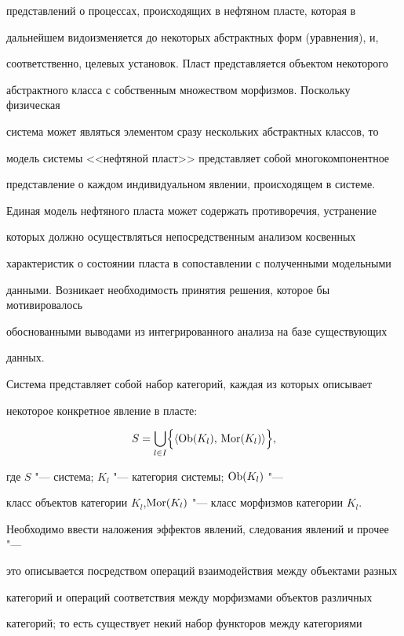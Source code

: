 представлений о процессах, происходящих в нефтяном пласте, которая в

дальнейшем видоизменяется до некоторых абстрактных форм (уравнения), и,

соответственно, целевых установок. Пласт представляется объектом некоторого

абстрактного класса с собственным множеством морфизмов. Поскольку физическая

система может являться элементом сразу нескольких абстрактных классов, то

модель системы <<нефтяной пласт>> представляет собой многокомпонентное

представление о каждом индивидуальном явлении, происходящем в системе.

Единая модель нефтяного пласта может содержать противоречия, устранение

которых должно осуществляться непосредственным анализом косвенных

характеристик о состоянии пласта в сопоставлении с полученными модельными

данными. Возникает необходимость принятия решения, которое бы мотивировалось

обоснованными выводами из интегрированного анализа на базе существующих

данных.



Система представляет собой набор категорий, каждая из которых описывает

некоторое конкретное явление в пласте:

$$

S=\bigcup\limits_{l \in I}

\Bigl\{ \left\langle {\rm Ob}(K_l ),\, {\rm Mor} ( {K_l } )  \right\rangle  \Bigr\}

,$$

где $S $ "--- система; $K_l$ "--- категория системы; ${\rm Ob}(K_l)$ "---

класс объектов категории $K_l$,${\rm Mor}(K_l)$ "--- класс морфизмов категории $K_l$.



Необходимо ввести наложения эффектов явлений, следования явлений и прочее "---

это описывается посредством операций взаимодействия между объектами разных

категорий и операций соответствия между морфизмами объектов различных

категорий; то есть существует некий набор функторов между категориями

